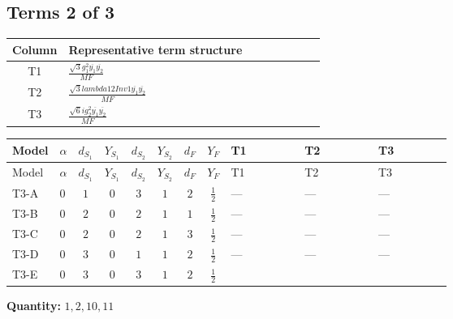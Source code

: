 \documentclass[8pt]{article}
\begin{document}
\begin{landscape}
\subsection*{Terms 2 of 3}
\begin{center}
\begin{tabular}{@{}c >{\raggedright\arraybackslash}p{0.82\linewidth}@{}}
\toprule
Column & Representative term structure \\
\midrule
T1 & \(\displaystyle \frac{\sqrt{3} g_{1}^{2} \overline{y_{1}} \overline{y_{2}}}{MF}\) \\
\midrule
T2 & \(\displaystyle \frac{\sqrt{3} lambda12Inv1 \overline{y_{1}} \overline{y_{2}}}{MF}\) \\
\midrule
T3 & \(\displaystyle \frac{\sqrt{6} i g_{2}^{2} \overline{y_{1}} \overline{y_{2}}}{MF}\) \\
\midrule
\bottomrule
\end{tabular}
\end{center}
\smallskip
\tiny
\begin{longtable}{@{}llcccccc >{\raggedright\arraybackslash}p{0.21\linewidth} >{\raggedright\arraybackslash}p{0.21\linewidth} >{\raggedright\arraybackslash}p{0.21\linewidth}@{}}
\toprule
Model & $\alpha$ & $d_{S_1}$ & $Y_{S_1}$ & $d_{S_2}$ & $Y_{S_2}$ & $d_F$ & $Y_F$ & T1 & T2 & T3 \\
\midrule
\endfirsthead
\toprule
Model & $\alpha$ & $d_{S_1}$ & $Y_{S_1}$ & $d_{S_2}$ & $Y_{S_2}$ & $d_F$ & $Y_F$ & T1 & T2 & T3 \\
\midrule
\endhead
T3-A & $0$ & $1$ & $0$ & $3$ & $1$ & $2$ & $\frac{1}{2}$ & --- & --- & --- \\
\midrule
T3-B & $0$ & $2$ & $0$ & $2$ & $1$ & $1$ & $\frac{1}{2}$ & --- & --- & --- \\
\midrule
T3-C & $0$ & $2$ & $0$ & $2$ & $1$ & $3$ & $\frac{1}{2}$ & --- & --- & --- \\
\midrule
T3-D & $0$ & $3$ & $0$ & $1$ & $1$ & $2$ & $\frac{1}{2}$ & --- & --- & --- \\
\midrule
T3-E & $0$ & $3$ & $0$ & $3$ & $1$ & $2$ & $\frac{1}{2}$ & \scriptsize\adjustbox{max width=\linewidth}{$\begin{gathered} - \frac{\sqrt{3} g_{1}^{2} \overline{y_{1}} \overline{y_{2}}}{8 MF}\end{gathered}$} & \scriptsize\adjustbox{max width=\linewidth}{$\begin{gathered} \frac{\sqrt{3} lambda12Inv1 \overline{y_{1}} \overline{y_{2}}}{6 MF}\end{gathered}$} & \scriptsize\adjustbox{max width=\linewidth}{$\begin{gathered} \frac{\sqrt{6} i g_{2}^{2} \overline{y_{1}} \overline{y_{2}}}{6 MF}\end{gathered}$} \\
\midrule
\bottomrule
\end{longtable}
\clearpage
\noindent\textbf{Quantity: }$\mathrm{1,2,10,11}$\par\smallskip

\end{landscape}
\end{document}
